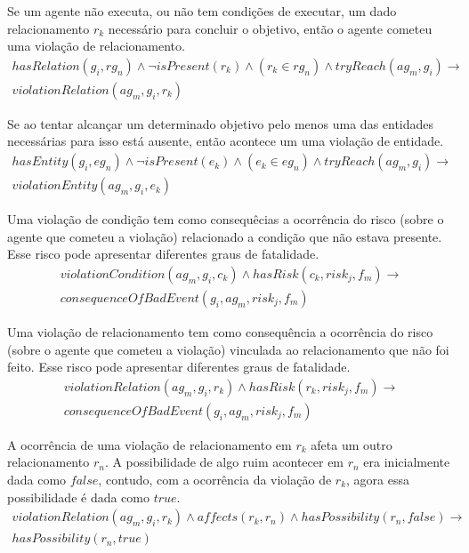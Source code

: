 \documentclass[12pt]{article}
\begin{document}
Se um agente não executa, ou não tem condições de executar, um dado relacionamento $r_k$ necessário para concluir o objetivo, então o agente cometeu uma violação de relacionamento. 
\begin{eqnarray}\label{rel4}\nonumber
	hasRelation(g_i,rg_n)\wedge \neg isPresent(r_k) \wedge (r_k \in rg_n) \wedge tryReach(ag_m,g_i) \to \nonumber \\
	violationRelation(ag_m,g_i,r_k)
\end{eqnarray}

Se ao tentar alcançar um determinado objetivo pelo menos uma das entidades necessárias para isso está ausente, então acontece um uma violação de entidade. 
\begin{eqnarray}\label{rel5}\nonumber
	hasEntity(g_i,eg_n) \wedge \neg isPresent(e_k) 	\wedge (e_k \in eg_n) \wedge tryReach(ag_m,g_i) \to \nonumber \\ violationEntity(ag_m,g_i,e_k)  
\end{eqnarray}


Uma violação de condição tem como consequêcias a ocorrência do risco (sobre o agente que cometeu a violação) relacionado a condição que não estava presente. Esse risco pode apresentar diferentes graus de fatalidade.
\begin{eqnarray}\label{rel9}\nonumber
	violationCondition(ag_m,g_i,c_k)  \wedge hasRisk(c_k,risk_j,f_m) \to \\ 
	consequenceOfBadEvent(g_i,ag_m,risk_j,f_m)
\end{eqnarray}

Uma violação de relacionamento tem como consequência a ocorrência do risco (sobre o agente que cometeu a violação) vinculada ao relacionamento que não foi feito. Esse risco pode apresentar diferentes graus de fatalidade.
\begin{eqnarray}\label{rel10}\nonumber
	violationRelation(ag_m,g_i,r_k) \wedge hasRisk(r_k,risk_j,f_m) \to \\ 
	consequenceOfBadEvent(g_i,ag_m,risk_j,f_m)
\end{eqnarray}

A ocorrência de uma violação de relacionamento em $r_k$ afeta um outro relacionamento $r_n$. A possibilidade de algo ruim acontecer em $r_n$ era inicialmente dada como $false$, contudo, com a ocorrência da violação de $r_k$, agora essa possibilidade é dada como  $true$.
\begin{eqnarray}\label{rel11}\nonumber
	violationRelation(ag_m,g_i,r_k) \wedge affects(r_k,r_n) \wedge hasPossibility(r_n,false) \to \\  
	hasPossibility(r_n,true)
\end{eqnarray}
\end{document}
